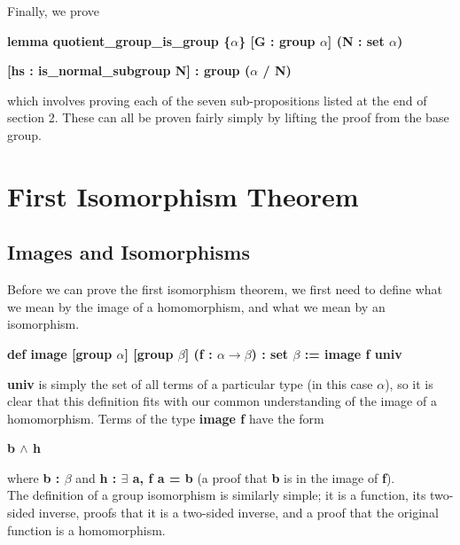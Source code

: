 \documentclass[runningheads,a4paper]{llncs}
\renewcommand{\a}{\alpha}
\renewcommand{\b}{\beta}
\renewcommand{\-}{\setminus}
\begin{document}
Finally, we prove

\vspace{2 mm}
\hspace{2 em}\textbf{lemma quotient\_group\_is\_group \{$\a$\} [G : group $\a$] (N : set $\a$)}

\hspace{4 em}\textbf{[hs : is\_normal\_subgroup N] : group ($\a$ / N)}
\vspace{2 mm}

which involves proving each of the seven sub-propositions listed at the end of section 2. These can all be proven fairly simply by lifting the proof from the base group.

\section{First Isomorphism Theorem}

\subsection{Images and Isomorphisms}

Before we can prove the first isomorphism theorem, we first need to define what we mean by the image of a homomorphism, and what we mean by an isomorphism.

\vspace{2 mm}
\hspace{2 em}\textbf{def image [group $\a$] [group $\b$] (f : $\a \to \b$) : set $\b$ := image f univ}
\vspace{2 mm}

\textbf{univ} is simply the set of all terms of a particular type (in this case $\a$), so it is clear that this definition fits with our common understanding of the image of a homomorphism. Terms of the type \textbf{image f} have the form

\vspace{2 mm}
\hspace{2 em}\textbf{b $\land$ h}
\vspace{2 mm}

where \textbf{b : $\b$} and \textbf{h : $\exists$ a, f a = b} (a proof that \textbf{b} is in the image of \textbf{f}).\\

The definition of a group isomorphism is similarly simple; it is a function, its two-sided inverse, proofs that it is a two-sided inverse, and a proof that the original function is a homomorphism.
\end{document}
